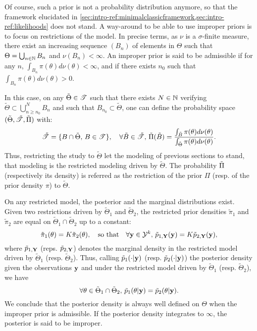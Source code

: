 Of course, such a prior is not a probability distribution anymore, so that the framework elucidated in \cref{sec:intro-ref:minimalclassicframework,sec:intro-ref:likelihoods} does not stand. 
A way-around to be able to use improper priors is to focus on restrictions of the model. In precise terms,  as $\nu$ is a $\sigma$-finite measure, there exist an increasing sequence $(B_n)$ of elements in $\Theta$ such that 
$\Theta=\bigcup_{n\in\mathbb{N}}B_n$ and $\nu(B_n) <\infty$.
An improper prior is said to be admissible if for any $n$, $\int_{B_n}\pi(\theta)d\nu(\theta)<\infty$, and if there exists $n_0$ such that $\int_{B_n}\pi(\theta)d\nu(\theta)>0$.

In this case, on any $\tilde\Theta\in\mathscr{T}$ such that there exists $N\in\mathbb{N}$ verifying $\tilde\Theta\subset\bigcup_{n\geq n_0}^NB_n$ and such that $B_{n_0}\subset\tilde\Theta$, one can define the probability space $(\tilde\Theta,\tilde{\mathscr{T}},\tilde\Pi)$ with:
    \begin{equation}
        \tilde{\mathscr{T}} = \{B\cap\tilde\Theta,\,B\in\mathscr{T}\},\quad\forall \tilde B\in\tilde{\mathscr{T}},\,\tilde\Pi(\tilde B) = \frac{\int_{\tilde B}\pi(\theta)d\nu(\theta)}{\int_{\tilde\Theta}\pi(\theta)d\nu(\theta)}.
    \end{equation}
Thus, restricting the study to $\tilde\Theta$ let the modeling of previous sections to stand, that modeling is the restricted modeling driven by $\tilde\Theta$. 
The probability $\Tilde\Pi$ (respectively its density) is referred as the restriction of the prior $\Pi$ (resp. of the prior density $\pi$) to $\tilde\Theta$.

On any restricted model, the posterior and the marginal distributions exist. 
Given two restrictions driven by $\tilde\Theta_1$ and $\tilde\Theta_2$, the restricted prior densities $\tilde\pi_1$ and $\tilde\pi_2$ are equal on $\tilde\Theta_1\cap\tilde\Theta_2$ up to a constant:
    \begin{equation}
        \tilde\pi_1(\theta) = K\tilde\pi_2(\theta),\quad\text{so that}\quad \forall \mathbf{y}\in\mathcal{Y}^k,\,\tilde p_{1,\mathbf{Y}}(\mathbf{y}) = K\tilde p_{2,\mathbf{Y}}(\mathbf{y}),
    \end{equation}
where $\tilde p_{1,\mathbf{Y}}$ (reps. $\tilde p_{2,\mathbf{Y}}$) denotes the marginal density in the restricted model driven by $\tilde\Theta_1$ (resp. $\tilde\Theta_2$). Thus, calling $\tilde p_1(\cdot | \mathbf{y})$ (resp. $\tilde p_2(\cdot | \mathbf{y})$) the posterior density given the observations $\mathbf{y}$ and under the restricted model driven by $\tilde\Theta_1$ (resp. $\tilde\Theta_2$), we have
    \begin{equation}
        \forall\theta\in\tilde\Theta_1\cap\tilde\Theta_2,\, \tilde p_1(\theta | \mathbf{y}) =\tilde p_2(\theta | \mathbf{y}).
    \end{equation}
We conclude that the posterior density is always well defined on $\Theta$ when the improper prior is admissible.
If the posterior density integrates to $\infty$, the posterior is said to be improper.



